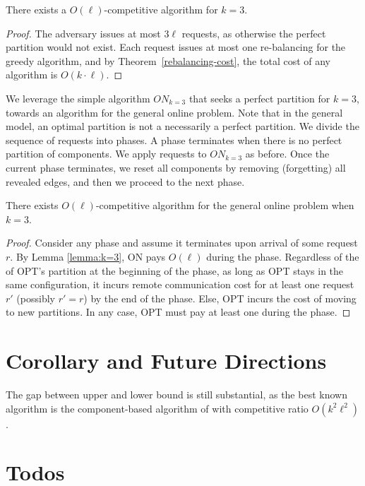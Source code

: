 \documentclass[manuscript,screen=true]{acmart}
\begin{document}
\begin{theorem}
  There exists a $O(\ell)$-competitive algorithm for $k=3$.
\end{theorem}

\begin{proof}
  The adversary issues at most $3\ell$ requests, as otherwise the perfect partition would not exist. Each request issues at most one re-balancing for the greedy algorithm, and by Theorem~\ref{rebalancing-cost}, the total cost of any algorithm is $O(k\cdot \ell)$.
\end{proof}

We leverage the simple algorithm $ON_{k=3}$ that seeks a perfect partition for $k=3$,
towards an algorithm for the general online problem.
Note that in the general model,
an optimal partition is not a necessarily a perfect partition.
We divide the sequence of requests into phases.
A phase terminates when there is no perfect partition of components.
We apply requests to $ON_{k=3}$ as before. 
Once the current phase terminates,
we reset all components by removing (forgetting) all revealed edges,
 and then we proceed to the next phase.

\begin{corollary} \label{cor:k=3}
    There exists $O(\ell)$-competitive  algorithm for the general online problem when $k=3$. 
\end{corollary}
\begin{proof}
    Consider any phase and assume it terminates upon arrival of some request $r$.
     By Lemma  \ref{lemma:k=3},
    ON pays $O(\ell)$ during the phase.
    Regardless of the of OPT's partition at the beginning of the phase,
    as long as OPT stays in the same configuration,
     it incurs remote communication cost for at least one request $r'$ (possibly $r'=r$) by the end of the phase.
     Else,
     OPT incurs the cost of moving to new partitions.
     In any case,
     OPT must pay at least one during the phase.
\end{proof}

\section{Corollary and Future Directions}

The gap between upper and lower bound is still substantial, as the best known algorithm is the component-based algorithm of   \cite{repartition-disc} with competitive ratio $O(k^2\ell^2)$.


\section{Todos}
\end{document}
